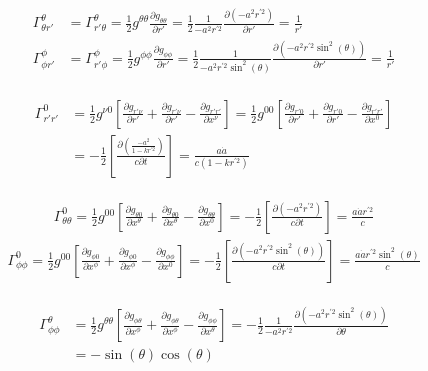 	\begin{gather*}
		\begin{aligned}
		\Gamma^{\theta}_{\theta r'}&=\Gamma^{\theta}_{r'\theta }=\frac{1}{2} g^{\theta\theta}\frac{\partial g_{\theta\theta}}{\partial r'}=\frac{1}{2}\frac{1}{-a^2 r^{'2}}\frac{\partial(-a^2 r^{'2})}{\partial r'}=\frac{1}{r'}\\
		\Gamma^{\phi}_{\phi r'}&=\Gamma^{\phi}_{r'\phi }=\frac{1}{2} g^{\phi\phi}\frac{\partial g_{\phi\phi}}{\partial r'}=\frac{1}{2}\frac{1}{-a^2 r^{'2}\sin^2(\theta)}\frac{\partial(-a^2 r^{'2}\sin^2(\theta))}{\partial r'}=\frac{1}{r'}
		\end{aligned}
	\end{gather*}
	
	\begin{gather*}
		\begin{aligned}
		\Gamma^{0}_{r' r'}&=\frac{1}{2} g^{\nu 0}\left[\frac{\partial g_{r'\nu}}{\partial r'}+\frac{\partial g_{r'\nu}}{\partial r'}-\frac{\partial g_{r'r'}}{\partial x^\nu}\right]=\frac{1}{2} g^{00}\left[\frac{\partial g_{r'0}}{\partial r'}+\frac{\partial g_{r'0}}{\partial r'}-\frac{\partial g_{r'r'}}{\partial x^0}\right]\\
		&=-\frac{1}{2}\left[\displaystyle\frac{\partial\left(\frac{-a^2}{1-k r^{'2}}\right)}{c\partial t}\right]=\frac{a\dot{a}}{c(1-k r^{'2})}
		\end{aligned}
	\end{gather*}
	
	\begin{gather*}
		\Gamma^0_{\theta\theta}=\frac{1}{2} g^{00}\left[\frac{\partial g_{\theta 0}}{\partial x^\theta}+\frac{\partial g_{\theta 0}}{\partial x^\theta}-\frac{\partial g_{\theta\theta}}{\partial x^0}\right]=-\frac{1}{2}\left[\frac{\partial(-a^2 r^{'2})}{c\partial t}\right]=\frac{a\dot{a} r^{'2}}{c}
	\end{gather*}
	\begin{gather*}
		\Gamma^0_{\phi\phi}=\frac{1}{2} g^{00}\left[\frac{\partial g_{\phi 0}}{\partial x^\phi}+\frac{\partial g_{\phi 0}}{\partial x^\phi}-\frac{\partial g_{\phi\phi}}{\partial x^0}\right]=-\frac{1}{2}\left[\frac{\partial(-a^2 r^{'2} \sin^2(\theta))}{c\partial t}\right]=\frac{a\dot{a} r^{'2}\sin^2(\theta)}{c}
	\end{gather*}
	
	\begin{gather*}
		\begin{aligned}
		\Gamma^\theta_{\phi\phi}&=\frac{1}{2} g^{\theta\theta}\left[\frac{\partial g_{\phi \theta}}{\partial x^\phi}+\frac{\partial g_{\phi \theta}}{\partial x^\phi}-\frac{\partial g_{\phi\phi}}{\partial x^\theta}\right]=-\frac{1}{2}\frac{1}{-a^2 r^{'2}} \frac{\partial(-a^2 r^{'2} \sin^2(\theta))}{\partial \theta}\\\
		&=-\sin(\theta)\cos(\theta)
		\end{aligned}
	\end{gather*}
	
